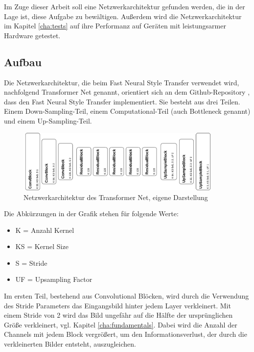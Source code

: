 Im Zuge dieser Arbeit soll eine Netzwerkarchitektur gefunden werden, die in der Lage ist, diese Aufgabe zu bewältigen. Außerdem wird die Netzwerkarchitektur im Kapitel \ref{cha:tests} auf ihre Performanz auf Geräten mit leistungsarmer Hardware getestet.

\subsection{Aufbau}
\label{sec:aufbau}

Die Netzwerkarchitektur, die beim Fast Neural Style Transfer verwendet wird, nachfolgend Transformer Net genannt, orientiert sich an dem Github-Repository \cite{PyTorchFastNeuralStyle}, dass den Fast Neural Style Transfer implementiert.
Sie besteht aus drei Teilen. Einem Down-Sampling-Teil, einem Computational-Teil (auch Bottleneck genannt) und einem Up-Sampling-Teil.

\begin{figure}[H]
	\centering
	\includegraphics[width=0.90\textwidth]{resources/content/transformer_net.png}
	\caption{Netzwerkarchitektur des Transformer Net, eigene Darstellung}
	\label{img:transformer_net_img}
\end{figure}

Die Abkürzungen in der Grafik stehen für folgende Werte:

\begin{itemize}
	\item K = Anzahl Kernel
	\item KS = Kernel Size
	\item S = Stride
	\item UF = Upsampling Factor
\end{itemize}

Im ersten Teil, bestehend aus Convolutional Blöcken, wird durch die Verwendung des Stride Parameters das Eingangsbild hinter jedem Layer verkleinert. Mit einem Stride von 2 wird das Bild ungefähr auf die Hälfte der ursprünglichen Größe verkleinert, vgl. Kapitel \ref{cha:fundamentals}. Dabei wird die Anzahl der Channels mit jedem Block vergrößert, um den Informationsverlust, der durch die verkleinerten Bilder entsteht, auszugleichen.

